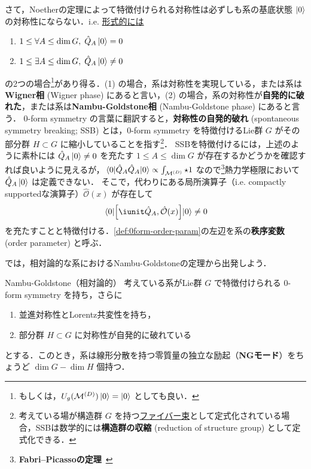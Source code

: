 \documentclass[TQFT_main]{subfiles}
\begin{document}
さて，Noetherの定理によって特徴付けられる対称性は必ずしも系の基底状態 $\ket{0}$ の対称性にならない．i.e. \underline{形式的には}
\begin{enumerate}
    \item $1 \le \forall A \le \dim G,\; \hat{Q}_A \ket{0} = 0$
    \item $1 \le \exists A \le \dim G,\; \hat{Q}_A \ket{0} \neq 0$
\end{enumerate}
の2つの場合\footnote{もしくは，$U_g(\mathcal{M}^{(D)}) \ket{0} = \ket{0}$ としても良い．}があり得る．(1) の場合，系は対称性を実現している，または系は\textbf{Wigner相} (Wigner phase) にあると言い，(2) の場合，系の対称性が\textbf{自発的に破れた}，または系は\textbf{Nambu-Goldstone相} (Nambu-Goldstone phase) にあると言う\cite[p.1]{Kugo1989qft2}．
$0$-form symmetry の言葉に翻訳すると，\textbf{対称性の自発的破れ} (spontaneous symmetry breaking; SSB) とは，$0$-form symmetry を特徴付けるLie群 $G$ がその部分群 $H \subset G$ に縮小していることを指す\footnote{考えている場が構造群 $G$ を持つ\hyperref[def.fiber-1]{ファイバー束}として定式化されている場合，SSBは数学的には\textbf{構造群の収縮} (reduction of structure group) として定式化できる．}．
SSBを特徴付けるには，上述のように素朴には $\hat{Q}_A \ket{0} \neq 0$ を充たす $1 \le A \le \dim G$ が存在するかどうかを確認すれば良いように見えるが，$\mel{0}{\hat{Q}_A \hat{Q}_A}{0} \propto \int_{\mathcal{M}^{(D)}} \star 1$ なので\footnote{\textbf{Fabri–Picassoの定理}~\cite{FabriPicasso1966qft}}熱力学極限において $\hat{Q}_A\ket{0}$ は定義できない．
そこで，代わりにある局所演算子（i.e. compactly supportedな演算子）$\hat{\mathcal{O}}(x)$ が存在して
\begin{align}
    \label{def:0form-order-param}
    \mel{0}{\comm{\iunit \hat{Q}_A}{\hat{\mathcal{O}}(x)}}{0} \neq 0
\end{align}
を充たすことと特徴付ける．\eqref{def:0form-order-param}の左辺を系の\textbf{秩序変数} (order parameter) と呼ぶ．

では，相対論的な系におけるNambu-Goldstoneの定理から出発しよう．

\begin{mytheo}[label=thm:NG-relativistic]{Nambu-Goldstone（相対論的）}
    考えている系がLie群 $G$ で特徴付けられる $0$-form symmetry を持ち，さらに
    \begin{enumerate}
        \item 並進対称性とLorentz共変性を持ち，
        \item 部分群 $H \subset G$ に対称性が自発的に破れている
    \end{enumerate}
    とする．このとき，系は線形分散を持つ零質量の独立な励起（\textbf{NGモード}）をちょうど $\dim G - \dim H$ 個持つ．
\end{mytheo}
\end{document}
